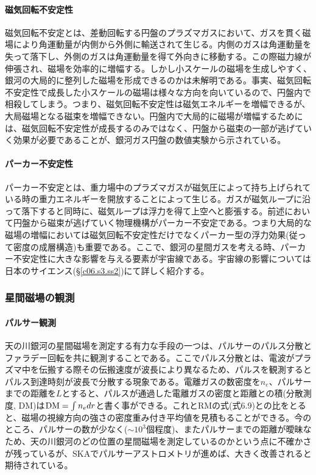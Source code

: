 \paragraph{磁気回転不安定性}

磁気回転不安定とは、差動回転する円盤のプラズマガスにおいて、ガスを貫く磁場により角運動量が内側から外側に輸送されて生じる。内側のガスは角運動量を失って落下し、外側のガスは角運動量を得て外向きに移動する。この際磁力線が伸張され、磁場を効率的に増幅する。しかし小スケールの磁場を生成しやすく、銀河の大局的に整列した磁場を形成できるのかは未解明である。事実、磁気回転不安定性で成長した小スケールの磁場は様々な方向を向いているので、円盤内で相殺してしまう。つまり、磁気回転不安定性は磁気エネルギーを増幅できるが、大局磁場となる磁束を増幅できない。円盤内で大局的に磁場が増幅するためには、磁気回転不安定性が成長するのみではなく、円盤から磁束の一部が逃げていく効果が必要であることが、銀河ガス円盤の数値実験から示されている\citep{2006ApJ...641..862N}。

\paragraph{パーカー不安定性}

パーカー不安定とは、重力場中のプラズマガスが磁気圧によって持ち上げられている時の重力エネルギーを開放することによって生じる。ガスが磁気ループに沿って落下すると同時に、磁気ループは浮力を得て上空へと膨張する。前述において円盤から磁束が逃げていく物理機構がパーカー不安定である。つまり大局的な磁場の増幅においては磁気回転不安定性だけでなくパーカー型の浮力効果(従って密度の成層構造)も重要である。ここで、銀河の星間ガスを考える時、パーカー不安定性に大きな影響を与える要素が宇宙線である。宇宙線の影響については日本のサイエンス(\S \ref{c06.s3.ss2})にて詳しく紹介する。

\subsubsection{星間磁場の観測}
\label{c06.s1.ss2.sss3}

\paragraph{パルサー観測}

天の川銀河の星間磁場を測定する有力な手段の一つは、パルサーのパルス分散とファラデー回転を共に観測することである。ここでパルス分散とは、電波がプラズマ中を伝搬する際その伝搬速度が波長により異なるため、パルスを観測するとパルス到達時刻が波長で分散する現象である。電離ガスの数密度を$n_e$、パルサーまでの距離を$L$とすると、パルスが通過した電離ガスの密度と距離との積(分散測度, DM)は${\rm DM} = \int n_e dr$と書く事ができる。これとRMの式(式6.9)との比をとると、磁場の視線方向の強さの密度重み付き平均値を見積もることができる。今のところ、パルサーの数が少なく($\sim 10^3$個程度)、またパルサーまでの距離が曖昧なため、天の川銀河のどの位置の星間磁場を測定しているのかという点に不確かさが残っているが、SKAでパルサーアストロメトリが進めば、大きく改善されると期待されている。

